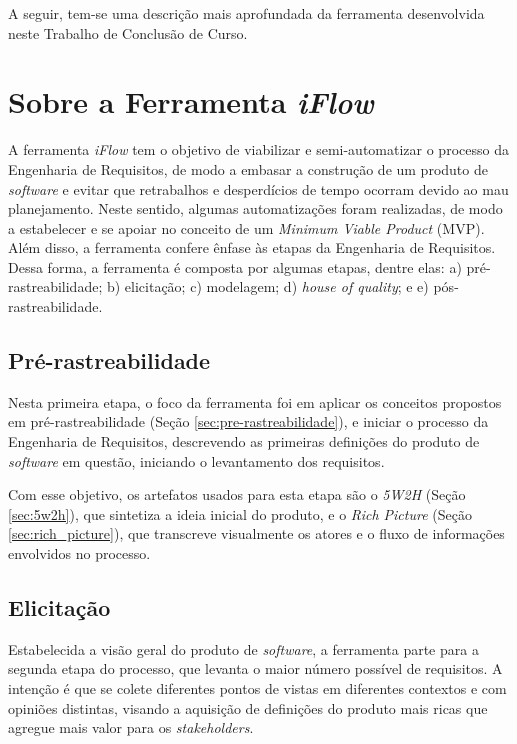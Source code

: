 A seguir, tem-se uma descrição mais aprofundada da ferramenta desenvolvida neste Trabalho de Conclusão de Curso.

\section{Sobre a Ferramenta \textit{iFlow}}

\label{sec:sobre_a_ferramenta}

A ferramenta \textit{iFlow} tem o objetivo de viabilizar e semi-automatizar o processo da Engenharia de Requisitos, de modo a embasar a construção de um produto de \textit{software} e evitar que retrabalhos e desperdícios de tempo ocorram devido ao mau planejamento. Neste sentido, algumas automatizações foram realizadas, de modo a estabelecer e se apoiar no conceito de um \textit{Minimum Viable Product} (MVP). Além disso, a ferramenta confere ênfase às etapas da Engenharia de Requisitos. Dessa forma, a ferramenta é composta por algumas etapas, dentre elas: 
a) pré-rastreabilidade; b) elicitação; c) modelagem; d) \textit{house of quality}; e e) pós-rastreabilidade. 

\subsection{Pré-rastreabilidade}

Nesta primeira etapa, o foco da ferramenta foi em aplicar os conceitos propostos em pré-rastreabilidade (Seção \ref{sec:pre-rastreabilidade}), e iniciar o processo da Engenharia de Requisitos, descrevendo as primeiras definições do produto de \textit{software} em questão, iniciando o levantamento dos requisitos.

Com esse objetivo, os artefatos usados para esta etapa são o \textit{5W2H} (Seção \ref{sec:5w2h}), que sintetiza a ideia inicial do produto, e o \textit{Rich Picture} (Seção \ref{sec:rich_picture}), que transcreve visualmente os atores e o fluxo de informações envolvidos no processo.

\subsection{Elicitação}

\label{sec:proc_elicitacao}

Estabelecida a visão geral do produto de \textit{software}, a ferramenta parte para a segunda etapa do processo, que levanta o maior número possível de requisitos. A intenção é que se colete diferentes pontos de vistas em diferentes contextos e com opiniões distintas, visando a aquisição de definições do produto mais ricas que agregue mais valor para os \textit{stakeholders}.


